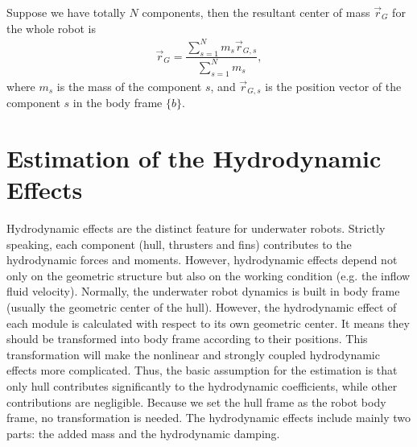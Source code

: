 Suppose we have totally $N$ components, then the resultant center of mass $ \vec{r}_{G} $ for the whole robot is 
\begin{align}
\vec{r}_{G}=\dfrac{\sum_{s=1}^{N}m_{s}\vec{r}_{G,s}}{\sum_{s=1}^{N}m_{s}},\label{EQ:CGAll}
\end{align} 
where $m_{s}$ is the mass of the component $s$, and $\vec{r}_{G,s}$ is the position vector of the component $s$ in the body frame $\lbrace b \rbrace$.

\section{Estimation of the Hydrodynamic Effects}
Hydrodynamic effects are the distinct feature for underwater robots. Strictly speaking, each component (hull, thrusters and fins) contributes to the hydrodynamic forces and moments. However, hydrodynamic effects depend not only on the geometric structure but also on the working condition (e.g. the inflow fluid velocity). Normally, the underwater robot dynamics is built in body frame (usually the geometric center of the hull). However, the hydrodynamic effect of each module is calculated with respect to its own geometric center. It means they should be transformed into body frame according to their positions. This transformation will make the nonlinear and strongly coupled hydrodynamic effects more complicated. Thus, the basic assumption for the estimation is that only hull contributes significantly to the hydrodynamic coefficients, while other contributions are negligible. Because we set the hull frame as the robot body frame, no transformation is needed. The hydrodynamic effects include mainly two parts: the added mass and the hydrodynamic damping. 


